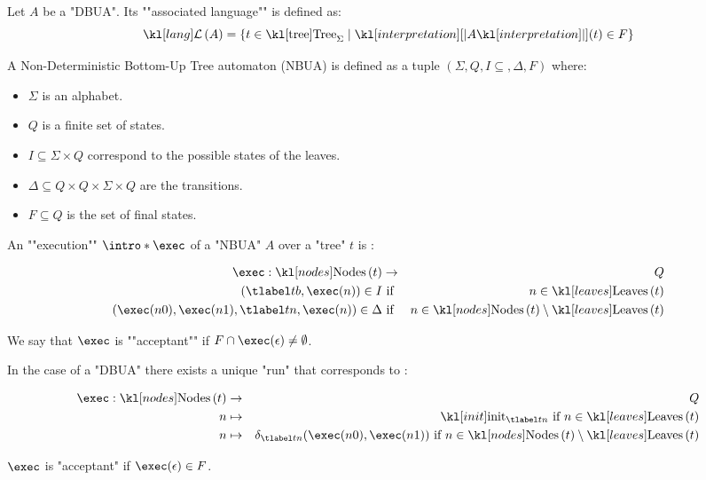 \documentclass{article}
\begin{document}
\begin{definition}
	Let $A$ be a "DBUA". Its ""associated language"" is defined as:
	\[\lang A = \setdef {t \in \tree_{\Sigma}} {\interpret A (t) \in F}\]
\end{definition}

\begin{definition}
	A Non-Deterministic Bottom-Up Tree automaton (NBUA) is defined as a tuple
	$(\Sigma, Q, I \subseteq, \Delta , F )$ where:
	\begin{itemize}
		\item $\Sigma$ is an alphabet.
		\item $Q$ is a finite set of states.
		\item $I \subseteq \Sigma \times Q$ correspond to the possible states of the leaves.
		\item $\Delta \subseteq Q \times Q \times \Sigma \times Q$ are the transitions.
		\item $F \subseteq Q$ is the set of final states.
	\end{itemize}
\end{definition}


\begin{definition}
	An ""execution"" $\intro* \exec$ of a "NBUA" $A$ over a "tree" $t$ is :

	\begin{eqnarray*}
		\exec : \nodes t &\to& Q \\
		(\tlabel t b,  \exec (n) ) \in I &\text{ if }& n \in \leaves t \\
		(\exec (n0), \exec (n1), \tlabel t n, \exec (n)) \in \Delta &\text{ if }& n \in \nodes t \setminus \leaves t
	\end{eqnarray*}

	We say that $\exec$ is ""acceptant"" if $F \cap \exec (\epsilon) \neq \emptyset$.
\end{definition}

\begin{remark}
	In the case of a "DBUA" there exists a unique "run" that corresponds to :

	\begin{eqnarray*}
		\exec : \nodes t &\to & Q \\
		n  &\mapsto& \init_{\tlabel t n} \text{ if } n \in \leaves t \\
		n  &\mapsto& \delta_{\tlabel t n}(\exec (n0), \exec (n1)) \text{ if } n \in \nodes t \setminus \leaves t
	\end{eqnarray*}

	$\exec$ is "acceptant" if $\exec (\epsilon) \in F$.
\end{remark}
\end{document}
